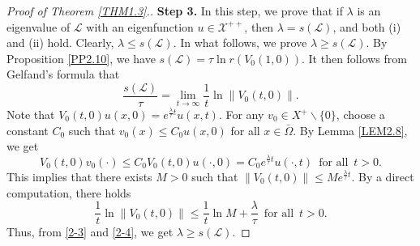\documentclass[11pt,reqno]{amsart}
\numberwithin{equation}{section}
\begin{document}
\begin{proof}[Proof of Theorem \ref{THM1.3}.]
\textbf{Step 3.} In this step, we prove that if $\lambda$ is an eigenvalue of $\mathcal{L}$ with an eigenfunction $u \in \mathcal{X}^{++}$, then $\lambda=s(\mathcal{L})$, and both (i) and (ii) hold.
Clearly, $\lambda \leq s(\mathcal{L})$.
In what follows, we prove $\lambda \geq s(\mathcal{L})$.
By Proposition \ref{PP2.10}, we have $s(\mathcal{L}) = \tau \ln r(V_{0}(1,0))$.
It then follows from Gelfand's formula that
\begin{equation}\label{2-3}
\frac{s(\mathcal{L})}{\tau} = \lim_{t\to\infty} \frac{1}{t} \ln \| V_{0}(t,0) \|.
\end{equation}
Note that $V_{0}(t,0)u(x,0) = e^{\frac{\lambda}{\tau}t}u(x,t)$.
For any $v_{0} \in X^{+}\backslash \{ 0 \}$, choose a constant $C_{0}$ such that $v_{0}(x) \leq C_{0}u(x,0)$ for all $x\in\bar{\Omega}$.
By Lemma \ref{LEM2.8}, we get
\begin{equation*}
V_{0}(t,0)v_{0}(\cdot) \leq C_{0}V_{0}(t,0)u(\cdot,0) = C_{0}e^{\frac{\lambda}{\tau}t}u(\cdot,t)
\enspace\text{for all}\enspace t>0.
\end{equation*}
This implies that there exists $M>0$ such that $\| V_{0}(t,0) \| \leq Me^{\frac{\lambda}{\tau}t}$.
By a direct computation, there holds
\begin{equation}\label{2-4}
\frac{1}{t} \ln \| V_{0}(t,0) \| \leq \frac{1}{t}\ln M + \frac{\lambda}{\tau}
\enspace\text{for all}\enspace t>0.
\end{equation}
Thus, from \eqref{2-3} and \eqref{2-4}, we get  $\lambda \geq s(\mathcal{L})$.


\end{proof}
\end{document}
